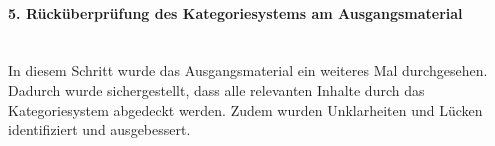 \paragraph{5. Rücküberprüfung des Kategoriesystems am Ausgangsmaterial}\mbox{} \\
In diesem Schritt wurde das Ausgangsmaterial ein weiteres Mal durchgesehen. Dadurch wurde sichergestellt, dass alle relevanten Inhalte durch das Kategoriesystem abgedeckt werden. Zudem wurden Unklarheiten und Lücken identifiziert und ausgebessert.
